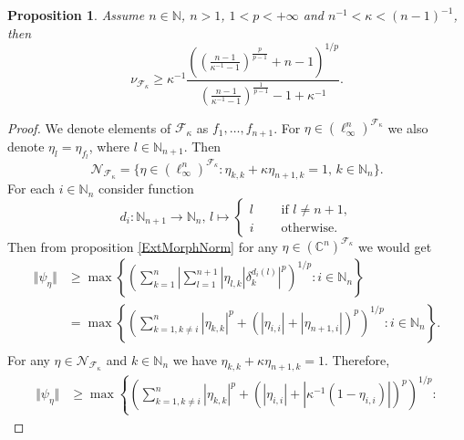 \documentclass[12pt]{article}
\newtheorem{proposition}[theorem]{Proposition}
\begin{document}
\begin{proposition}\label{ExtMorphsNormLwrBnd}
    Assume $n\in\mathbb{N}$, $n>1$, $1<p<+\infty$ 
    and $n^{-1}<\kappa<(n-1)^{-1}$, then
    \[
        \nu_{\mathcal{F}_{\kappa}}
        \geq 
        \kappa^{-1}\frac{
            \left(
                \left(\frac{n-1}{\kappa^{-1}-1}\right)^{\frac{p}{p-1}}+n-1
            \right)^{1/p}
        }{
            \left(\frac{n-1}{\kappa^{-1}-1}\right)^{\frac{1}{p-1}}-1+\kappa^{-1}
        }.
    \]
\end{proposition}
\begin{proof}
    We denote elements of $\mathcal{F}_{\kappa}$ as $f_1,\ldots,f_{n+1}$. For
    $\eta\in(\ell_\infty^n)^{\mathcal{F}_{\kappa}}$ we also 
    denote $\eta_l=\eta_{f_l}$, where $l\in\mathbb{N}_{n+1}$. Then
    \[
        \mathcal{N}_{\mathcal{F}_{\kappa}}=\{
            \eta\in(\ell_{\infty}^{n})^{\mathcal{F}_{\kappa}}:
            \eta_{k,k}+\kappa \eta_{n+1, k}=1,\, k\in\mathbb{N}_n
        \}.
    \]
    For each $i\in\mathbb{N}_n$ consider function
    \[
        d_i:\mathbb{N}_{n+1}\to\mathbb{N}_n,\,
        l\mapsto
        \begin{cases}
            l\quad &\mbox{ if }l\neq n+1,\\
            i\quad &\mbox{ otherwise. }
        \end{cases}
    \]
    Then from proposition \ref{ExtMorphNorm} for 
    any $\eta\in(\mathbb{C}^n)^{\mathcal{F}_{\kappa}}$ we would get
    \[
    \begin{aligned}
        \Vert\psi_{\eta}\Vert
        &\geq\max\left\{
            \left(\sum_{k=1}^n
                \left|\sum_{l=1}^{n+1}|\eta_{l,k}|\delta_{k}^{d_i(l)}\right|^p
            \right)^{1/p}:
            i\in\mathbb{N}_n
        \right\} \\
        &=\max\left\{
            \left(
                \sum_{k=1,k\neq i}^n |\eta_{k,k}|^p+
                (|\eta_{i,i}|+|\eta_{n+1,i}|)^p
            \right)^{1/p}:
            i\in\mathbb{N}_n
        \right\}. \\
    \end{aligned}
    \]
    For any $\eta\in\mathcal{N}_{\mathcal{F}_{\kappa}}$ 
    and $k\in\mathbb{N}_n$ we have $\eta_{k,k}+\kappa \eta_{n+1, k}=1$. 
    Therefore,
    \[
    \begin{aligned}
        \Vert \psi_{\eta}\Vert
        &\geq\max\left\{
            \left(
                \sum_{k=1,k\neq i}^n |\eta_{k,k}|^p+
                (|\eta_{i,i}|+|\kappa^{-1}(1-\eta_{i,i})|)^p
            \right)^{1/p}:

\end{aligned}\]
\end{proof}
\end{document}

